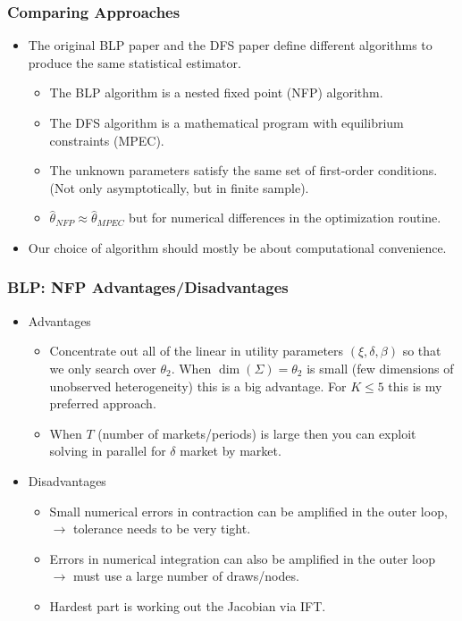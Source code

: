 \begin{frame}
\frametitle{Comparing Approaches}
\begin{itemize}
\item The original BLP paper and the DFS paper define different \alert{algorithms} to produce the same statistical \alert{estimator}.
\begin{itemize}
\item The BLP algorithm is a \alert{nested fixed point} (NFP) algorithm. 
\item The DFS algorithm is a \alert{mathematical program with equilibrium constraints} (MPEC).
\item The unknown parameters satisfy the same set of first-order conditions. (Not only asymptotically, but in finite sample).
\item $\hat{\theta}_{NFP} \approx \hat{\theta}_{MPEC}$ but for numerical differences in the optimization routine.
\end{itemize}
\item Our choice of algorithm should mostly be about computational convenience.
\end{itemize}
\end{frame}

\begin{frame}
\frametitle{BLP: NFP Advantages/Disadvantages}
\begin{itemize}
\item Advantages
\begin{itemize}
\item Concentrate out all of the linear in utility parameters $(\xi,\delta,\beta)$ so that we only search over $\theta_2$. When $\dim(\Sigma)=\theta_2$ is small (few dimensions of unobserved heterogeneity) this is a big advantage. For $K \leq 5$ this is my preferred approach.
\item When $T$ (number of markets/periods) is large then you can exploit solving in parallel for $\delta$ market by market.
\end{itemize}
\item Disadvantages
\begin{itemize}
\item Small numerical errors in contraction can be amplified in the outer loop, $\rightarrow$ tolerance needs to be very tight.
\item Errors in numerical integration can also be amplified in the outer loop $\rightarrow$ must use a large number of draws/nodes.
\item Hardest part is working out the Jacobian via IFT.
\end{itemize}
\end{itemize}
\end{frame}

